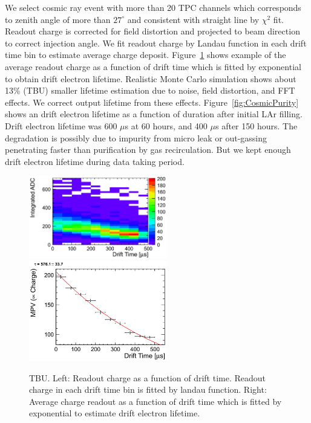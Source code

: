 We select cosmic ray event with more than 20 TPC channels which corresponds to zenith angle of more than $27^\circ$ and consistent with straight line by $\chi^2$ fit. 
Readout charge is corrected for field distortion and projected to beam direction to correct injection angle.
We fit readout charge by Landau function in each drift time bin to estimate average charge deposit. 
Figure~\ref{fig:tauExample} shows example of the average readout charge as a function of drift time which is fitted by exponential to obtain drift electron lifetime. 
Realistic Monte Carlo simulation shows about 13\% (TBU) smaller lifetime estimation due to noise, field distortion, and FFT effects. 
We correct output lifetime from these effects.
Figure~\ref{fig:CosmicPurity} shows an drift electron lifetime as a function of duration after initial LAr filling.
Drift electron lifetime was 600 $\mu$s at 60 hours, and 400 $\mu$s after 150 hours.
The degradation is possibly due to impurity from micro leak or out-gassing penetrating faster than purification by gas recirculation.
But we kept enough drift electron lifetime during data taking period.

\begin{figure}[htbp]
 \begin{center}
  \includegraphics[width=60mm]{fig/chargeDep.eps}
  \includegraphics[width=60mm]{fig/tauExample.eps}
 \end{center}
 \caption{TBU. Left: Readout charge as a function of drift time. Readout charge in each drift time bin is fitted by landau function. Right: Average charge readout as a function of drift time which is fitted by exponential to estimate drift electron lifetime.}
 \label{fig:tauExample}
\end{figure}


